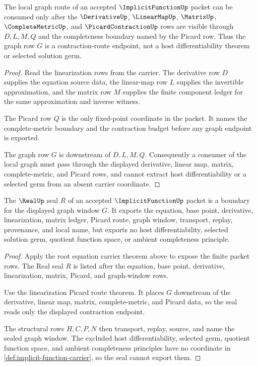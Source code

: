\begin{theorem}
\label{thm:implicit-function-linearization-picard-route}
The local graph route of an accepted $\ImplicitFunctionUp$ packet can be consumed only after the $\DerivativeUp$, $\LinearMapUp$, $\MatrixUp$, $\CompleteMetricUp$, and $\PicardContractionUp$ rows are visible through $D,L,M,Q$ and the completeness boundary named by the Picard row. Thus the graph row $G$ is a contraction-route endpoint, not a host differentiability theorem or selected solution germ.
\end{theorem}
\begin{proof}
Read the linearization rows from the carrier. The derivative row $D$ supplies the equation source data, the linear-map row $L$ supplies the invertible approximation, and the matrix row $M$ supplies the finite component ledger for the same approximation and inverse witness.

The Picard row $Q$ is the only fixed-point coordinate in the packet. It names the complete-metric boundary and the contraction budget before any graph endpoint is exported.

The graph row $G$ is downstream of $D,L,M,Q$. Consequently a consumer of the local graph must pass through the displayed derivative, linear map, matrix, complete-metric, and Picard rows, and cannot extract host differentiability or a selected germ from an absent carrier coordinate.
\end{proof}

\begin{theorem}
\label{thm:implicit-function-local-graph-seal-handoff}
The $\RealUp$ seal $R$ of an accepted $\ImplicitFunctionUp$ packet is a boundary for the displayed graph window $G$. It exports the equation, base point, derivative, linearization, matrix ledger, Picard route, graph window, transport, replay, provenance, and local name, but exports no host differentiability, selected solution germ, quotient function space, or ambient completeness principle.
\end{theorem}
\begin{proof}
Apply the root equation carrier theorem above to expose the finite packet rows. The Real seal $R$ is listed after the equation, base point, derivative, linearization, matrix, Picard, and graph-window rows.

Use the linearization Picard route theorem. It places $G$ downstream of the derivative, linear map, matrix, complete-metric, and Picard data, so the seal reads only the displayed contraction endpoint.

The structural rows $H,C,P,N$ then transport, replay, source, and name the sealed graph window. The excluded host differentiability, selected germ, quotient function space, and ambient completeness principles have no coordinate in \autoref{def:implicit-function-carrier}, so the seal cannot export them.
\end{proof}

